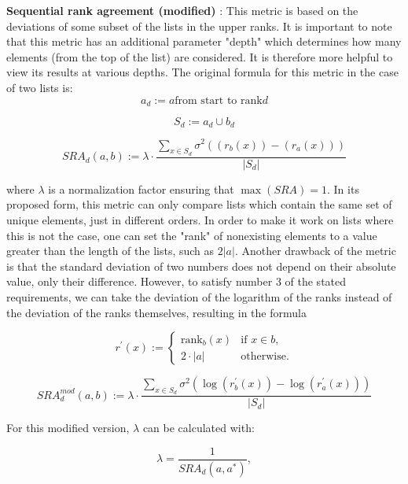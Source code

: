 \begin{description}
	\item \textbf{Sequential rank agreement (modified)} \cite{ekstromSequentialRankAgreement2015}: This metric is based on the deviations of some subset of the lists in the upper ranks.
        It is important to note that this metric has an additional parameter "depth" which determines how many elements (from the top of the list) are considered.
        It is therefore more helpful to view its results at various depths.
        The original formula for this metric in the case of two lists is:
	      \[
		      a_{d} := a \text{from start to rank} d
	      \]

	      \[
              S_{d} := a_{d} \cup b_{d} 
	      \]

	      \[
              SRA_{d}(a, b) := \lambda \cdot \frac{\sum_{x \in S_{d}} \sigma ^2 \left( \left( r_{b}(x) \right) - \left( r_{a}(x) \right) \right)}{|S_{d}|}
	      \]

	      where \(\lambda\) is a normalization factor ensuring that \(\max(SRA) = 1\).
	      In its proposed form, this metric can only compare lists which contain the same set of unique elements, just in different orders.
	      In order to make it work on lists where this is not the case, one can set the "rank" of nonexisting elements to a value greater than the length of the lists, such as \(2 |a|\).
	      Another drawback of the metric is that the standard deviation of two numbers does not depend on their absolute value, only their difference.
	      However, to satisfy number 3 of the stated requirements, we can take the deviation of the logarithm of the ranks instead of the deviation of the ranks themselves, resulting in the formula

	      \[
		      r^{\prime}(x) :=
		      \begin{cases}
			      \mathrm{rank}_{b}(x) & \text{if } x \in b, \\
			      2 \cdot |a|          & \text{otherwise.}
		      \end{cases}
	      \]

	      \[
              SRA^{mod}_{d}(a, b) := \lambda \cdot \frac{\sum_{x \in S_{d}} \sigma ^2 \left( \log (r^{\prime}_{b}(x))-\log(r^{\prime}_{a}(x))\right)}{|S_{d}|}
	      \]

	      For this modified version, \(\lambda\) can be calculated with:

	      \[
		      \lambda = \frac{1}{SRA_{d}(a, a^{*})},
	      \]


\end{description}
